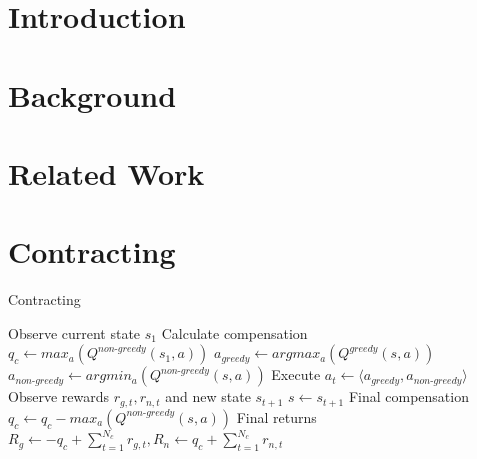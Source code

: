 \section{Introduction}\label{sec:introduction}


\section{Background}\label{sec:background}


\section{Related Work}\label{sec:related_work}


\section{Contracting}\label{sec:contracting}


\begin{algorithm}
\caption{Contracting}\label{algorithm:STEP}
\begin{algorithmic}[1]
\State Observe current state $s_{1}$
\State Calculate compensation $q_{\textit{c}} \leftarrow max_{a}(Q^{\textit{non-greedy}}(s_{1}, a))$
\State $a_{\textit{greedy}} \leftarrow argmax_{a}(Q^{\textit{greedy}}(s, a))$
\State $a_{\textit{non-greedy}} \leftarrow argmin_{a}(Q^{\textit{non-greedy}}(s, a))$
\State Execute $a_{t} \leftarrow \langle a_{\textit{greedy}}, a_{\textit{non-greedy}} \rangle$
\State  Observe rewards $r_{g, t}, r_{n,  t}$ and new state $s_{t+1}$
\State $s \leftarrow s_{t+1}$
\EndFor
\State Final compensation $q_{\textit{c}} \leftarrow q_{\textit{c}} - max_{a}(Q^{\textit{non-greedy}}(s, a))$
\State Final returns $R_g \leftarrow - q_{\textit{c}} + \sum_{t=1}^{N_c} r_{g, t}, R_n \leftarrow  q_{\textit{c}} + \sum_{t=1}^{N_c} r_{n, t} $
\EndProcedure
\end{algorithmic}
\end{algorithm}


